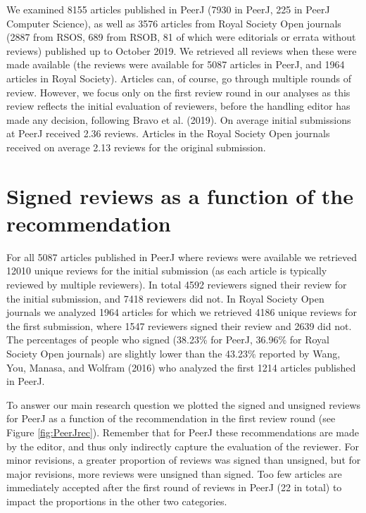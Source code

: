 \documentclass[
  english,
  ,jou, a4paper,floatsintext]{apa6}
\begin{document}
We examined 8155 articles published in PeerJ (7930 in PeerJ, 225 in PeerJ Computer Science), as well as 3576 articles from Royal Society Open journals (2887 from RSOS, 689 from RSOB, 81 of which were editorials or errata without reviews) published up to October 2019. We retrieved all reviews when these were made available (the reviews were available for 5087 articles in PeerJ, and 1964 articles in Royal Society). Articles can, of course, go through multiple rounds of review. However, we focus only on the first review round in our analyses as this review reflects the initial evaluation of reviewers, before the handling editor has made any decision, following Bravo et al. (2019). On average initial submissions at PeerJ received 2.36 reviews. Articles in the Royal Society Open journals received on average 2.13 reviews for the original submission.

\hypertarget{signed-reviews-as-a-function-of-the-recommendation}{%
\section{Signed reviews as a function of the recommendation}\label{signed-reviews-as-a-function-of-the-recommendation}}

For all 5087 articles published in PeerJ where reviews were available we retrieved 12010 unique reviews for the initial submission (as each article is typically reviewed by multiple reviewers). In total 4592 reviewers signed their review for the initial submission, and 7418 reviewers did not. In Royal Society Open journals we analyzed 1964 articles for which we retrieved 4186 unique reviews for the first submission, where 1547 reviewers signed their review and 2639 did not. The percentages of people who signed (38.23\% for PeerJ, 36.96\% for Royal Society Open journals) are slightly lower than the 43.23\% reported by Wang, You, Manasa, and Wolfram (2016) who analyzed the first 1214 articles published in PeerJ.

To answer our main research question we plotted the signed and unsigned reviews for PeerJ as a function of the recommendation in the first review round (see Figure \ref{fig:PeerJrec}). Remember that for PeerJ these recommendations are made by the editor, and thus only indirectly capture the evaluation of the reviewer. For minor revisions, a greater proportion of reviews was signed than unsigned, but for major revisions, more reviews were unsigned than signed. Too few articles are immediately accepted after the first round of reviews in PeerJ (22 in total) to impact the proportions in the other two categories.
\end{document}
